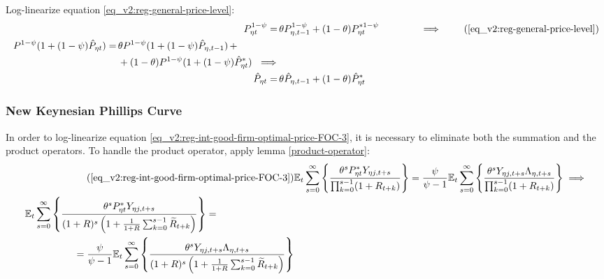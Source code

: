 \documentclass[../thesis.tex]{subfiles}
\begin{document}
Log-linearize equation \ref{eq_v2:reg-general-price-level}:
\begin{align}
	P_{\eta t}^{1-\psi} =\, &\theta P_{\eta, t-1}^{1-\psi} + (1-\theta) P_{\eta t}^{\ast 1-\psi} \qquad \qquad \implies \tag{\ref{eq_v2:reg-general-price-level}} \\
	\begin{split} P^{1-\psi} (1 + (1-\psi)\hat{P}_{\eta t}) =\, &\theta P^{1-\psi} (1 + (1-\psi)\hat{P}_{\eta, t-1}) \, + \\ & + (1-\theta) P^{1-\psi} (1 + (1-\psi)\hat{P}_{\eta t}^{\ast}) \ \implies \nonumber \end{split} \\
	\hat{P}_{\eta t} =\, &\theta \hat{P}_{\eta, t-1} + (1-\theta) \hat{P}_{\eta t}^{\ast}
	\label{eq_v2:reg-ll-general-price-level}
\end{align}


\subsubsection*{New Keynesian Phillips Curve}

In order to log-linearize equation \ref{eq_v2:reg-int-good-firm-optimal-price-FOC-3}, it is necessary to eliminate both the summation and the product operators. To handle the product operator, apply lemma \ref{product-operator}:
\begin{align}
	\tag{\ref{eq_v2:reg-int-good-firm-optimal-price-FOC-3}}
	& \E \sum_{s=0}^{\infty} \left\{ \frac{\theta^s P_{\eta t}^{\ast} Y_{\eta j,t+s}}{ \prod_{k=0}^{s-1}(1+R_{t+k})} \right\} = \frac{\psi}{\psi-1} \E \sum_{s=0}^{\infty} \left\{ \frac{\theta^s Y_{\eta j,t+s} \Lambda_{\eta, t+s}}{\prod_{k=0}^{s-1}(1+R_{t+k})} \right\} \implies
	\\
	\begin{split}
		& \E \sum_{s=0}^{\infty} \left\{ \frac{\theta^s P_{\eta t}^{\ast} Y_{\eta j,t+s}}{ (1 + R)^s \left( 1 + \frac{1}{1 + R} \sum_{k=0}^{s-1} \widetilde{R}_{t+k} \right)} \right\} = 
		\\ & \quad \quad \quad \quad \quad = \frac{\psi}{\psi-1} \E \sum_{s=0}^{\infty} \left\{ \frac{\theta^s Y_{\eta j,t+s} \Lambda_{\eta, t+s}}{ (1 + R)^s \left( 1 + \frac{1}{1 + R} \sum_{k=0}^{s-1} \widetilde{R}_{t+k} \right)} \right\} \label{eq_v2:reg-ll-optimal-price}
	\end{split}
\end{align}
\end{document}
